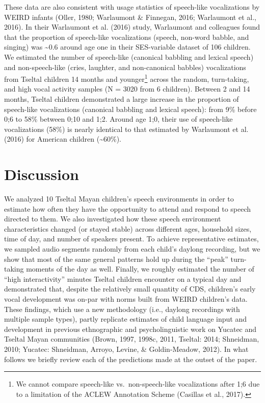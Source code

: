 \documentclass[floatsintext,man]{apa6}
\theoremstyle{definition}
\theoremstyle{definition}
\theoremstyle{definition}
\theoremstyle{remark}
\begin{document}
These data are also consistent with usage statistics of speech-like
vocalizations by WEIRD infants (Oller, 1980; Warlaumont \& Finnegan,
2016; Warlaumont et al., 2016). In their Warlaumont et al. (2016) study,
Warlaumont and colleagues found that the proportion of speech-like
vocalizations (speech, non-word babble, and singing) was
\textasciitilde{}0.6 around age one in their SES-variable dataset of 106
children. We estimated the number of speech-like (canonical babbling and
lexical speech) and non-speech-like (cries, laughter, and non-canonical
babbles) vocalizations from Tseltal children 14 months and
younger\footnote{We cannot compare speech-like vs.~non-speech-like
  vocalizations after 1;6 due to a limitation of the ACLEW Annotation
  Scheme (Casillas et al., 2017).} across the random, turn-taking, and
high vocal activity samples (N = 3020 from 6 children). Between 2 and 14
months, Tseltal children demonstrated a large increase in the proportion
of speech-like vocalizations (canonical babbling and lexical speech):
from 9\% before 0;6 to 58\% between 0;10 and 1;2. Around age 1;0, their
use of speech-like vocalizations (58\%) is nearly identical to that
estimated by Warlaumont et al. (2016) for American children
(\textasciitilde{}60\%).

\section{Discussion}\label{disc}

We analyzed 10 Tseltal Mayan children's speech environments in order to
estimate how often they have the opportunity to attend and respond to
speech directed to them. We also investigated how these speech
environment characteristics changed (or stayed stable) across different
ages, household sizes, time of day, and number of speakers present. To
achieve representative estimates, we sampled audio segments randomly
from each child's daylong recording, but we show that most of the same
general patterns hold up during the \enquote{peak} turn-taking moments
of the day as well. Finally, we roughly estimated the number of
\enquote{high interactivity} minutes Tseltal children encounter on a
typical day and demonstrated that, despite the relatively small quantity
of CDS, children's early vocal development was on-par with norms built
from WEIRD children's data. These findings, which use a new methodology
(i.e., daylong recordings with multiple sample types), partly replicate
estimates of child language input and development in previous
ethnographic and psycholinguistic work on Yucatec and Tseltal Mayan
communities (Brown, 1997, 1998c, 2011, Tseltal: 2014; Shneidman, 2010;
Yucatec: Shneidman, Arroyo, Levine, \& Goldin-Meadow, 2012). In what
follows we briefly review each of the predictions made at the outset of
the paper.
\end{document}
